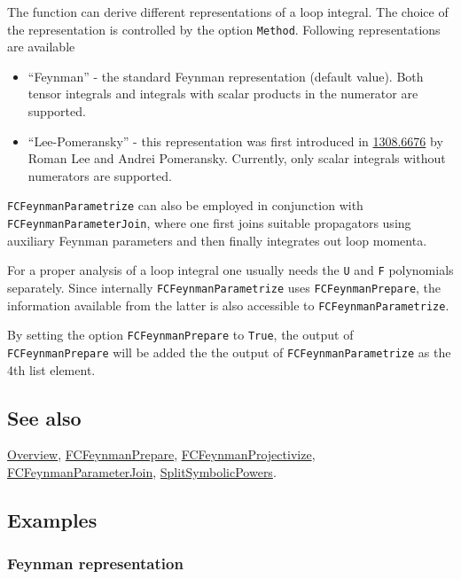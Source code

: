 \documentclass[../FeynCalcManual.tex]{subfiles}
\begin{document}
The function can derive different representations of a loop integral.
The choice of the representation is controlled by the option
\texttt{Method}. Following representations are available

\begin{itemize}
\tightlist
\item
  ``Feynman'' - the standard Feynman representation (default value).
  Both tensor integrals and integrals with scalar products in the
  numerator are supported.
\item
  ``Lee-Pomeransky'' - this representation was first introduced in
  \href{https://arxiv.org/abs/1308.6676}{1308.6676} by Roman Lee and
  Andrei Pomeransky. Currently, only scalar integrals without numerators
  are supported.
\end{itemize}

\texttt{FCFeynmanParametrize} can also be employed in conjunction with
\texttt{FCFeynmanParameterJoin}, where one first joins suitable
propagators using auxiliary Feynman parameters and then finally
integrates out loop momenta.

For a proper analysis of a loop integral one usually needs the
\texttt{U} and \texttt{F} polynomials separately. Since internally
\texttt{FCFeynmanParametrize} uses \texttt{FCFeynmanPrepare}, the
information available from the latter is also accessible to
\texttt{FCFeynmanParametrize}.

By setting the option \texttt{FCFeynmanPrepare} to \texttt{True}, the
output of \texttt{FCFeynmanPrepare} will be added the the output of
\texttt{FCFeynmanParametrize} as the 4th list element.

\subsection{See also}

\hyperlink{toc}{Overview},
\hyperlink{fcfeynmanprepare}{FCFeynmanPrepare},
\hyperlink{fcfeynmanprojectivize}{FCFeynmanProjectivize},
\hyperlink{fcfeynmanparameterjoin}{FCFeynmanParameterJoin},
\hyperlink{splitsymbolicpowers}{SplitSymbolicPowers}.

\subsection{Examples}

\hypertarget{feynman-representation}{%
\subsubsection{Feynman representation}\label{feynman-representation}}
\end{document}
